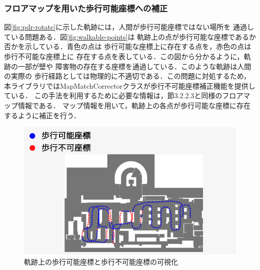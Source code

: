 
\subsubsection{フロアマップを用いた歩行可能座標への補正}

図\ref{fig:pdr-rotate}に示した軌跡には，人間が歩行可能座標ではない場所を
通過している問題ある．図\ref{fig:walkable-points}は
軌跡上の点が歩行可能な座標であるか否かを示している．青色の点は
歩行可能な座標上に存在する点を，赤色の点は歩行不可能な座標上に
存在する点を表している．この図から分かるように，軌跡の一部が壁や
障害物の存在する座標を通過している．このような軌跡は人間の実際の
歩行経路としては物理的に不適切である．この問題に対処するため，
本ライブラリではMapMatchCorrectorクラスが歩行不可能座標補正機能を提供している．
この手法を利用するために必要な情報は，節3.2.2.3と同様のフロアマップ情報である．
マップ情報を用いて，軌跡上の各点が歩行可能な座標に存在するように補正を行う．


\begin{figure}[H]
    \centering
    \includegraphics[width=\linewidth]{../image/unwalkable_points.jpg}
    \caption{
      軌跡上の歩行可能座標と歩行不可能座標の可視化
    }    \label{fig:unwalkable_points}
\end{figure}

